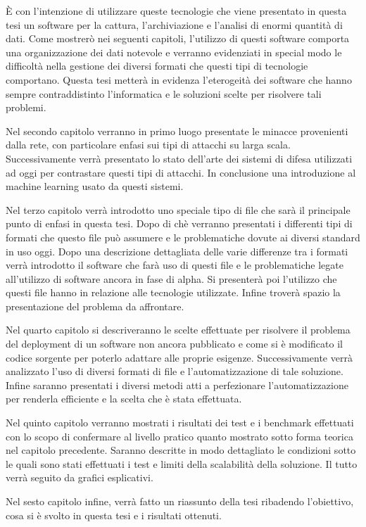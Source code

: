 \documentclass[../main.tex]{subfiles}
\begin{document}
È con l'intenzione di utilizzare queste tecnologie che viene presentato in questa tesi un software per la cattura, l'archiviazione e l'analisi di enormi quantità di dati. Come mostrerò nei seguenti capitoli, l'utilizzo di questi software comporta una organizzazione dei dati notevole e verranno evidenziati in special modo le difficoltà nella gestione dei diversi formati che questi tipi di tecnologie comportano. Questa tesi metterà in evidenza l'eterogeità dei software che hanno sempre contraddistinto l'informatica e le soluzioni scelte per risolvere tali problemi.

Nel secondo capitolo verranno in primo luogo presentate le minacce provenienti dalla rete, con particolare enfasi sui tipi di attacchi su larga scala. Successivamente verrà presentato lo stato dell'arte dei sistemi di difesa utilizzati ad oggi per contrastare questi tipi di attacchi. In conclusione una introduzione al machine learning usato da questi sistemi.

Nel terzo capitolo verrà introdotto uno speciale tipo di file che sarà il principale punto di enfasi in questa tesi. Dopo di chè verranno presentati i differenti tipi di formati che questo file può assumere e le problematiche dovute ai diversi standard in uso oggi. Dopo una descrizione dettagliata delle varie differenze tra i formati verrà introdotto il software che farà uso di questi file e le problematiche legate all'utilizzo di software ancora in fase di alpha. Si presenterà poi l'utilizzo che questi file hanno in relazione alle tecnologie utilizzate. Infine troverà spazio la presentazione del problema da affrontare.


Nel quarto capitolo si descriveranno le scelte effettuate per risolvere il problema del deployment di un software non ancora pubblicato e come si è modificato il codice sorgente per poterlo adattare alle proprie esigenze. Successivamente verrà analizzato l'uso di diversi formati di file e l'automatizzazione di tale soluzione. Infine saranno presentati i diversi metodi atti a perfezionare l'automatizzazione per renderla efficiente e la scelta che è stata effettuata.

Nel quinto capitolo verranno mostrati i risultati dei test e i benchmark effettuati con lo scopo di confermare al livello pratico quanto mostrato sotto forma teorica nel capitolo precedente. Saranno descritte in modo dettagliato le condizioni sotto le quali sono stati effettuati i test e limiti della scalabilità della soluzione. Il tutto verrà seguito da grafici esplicativi.

Nel sesto capitolo infine, verrà fatto un riassunto della tesi ribadendo l'obiettivo, cosa si è svolto in questa tesi e i risultati ottenuti.
\end{document}
